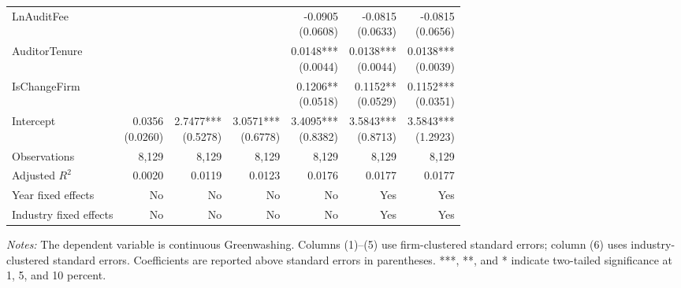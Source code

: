 \begin{table}[htbp]
{\begin{tabular}{lrrrrrr}
LnAuditFee &  &  &  & \shortstack{-0.0905 \\ (0.0608)} & \shortstack{-0.0815 \\ (0.0633)} & \shortstack{-0.0815 \\ (0.0656)}\\[8pt]
AuditorTenure &  &  &  & \shortstack{0.0148*** \\ (0.0044)} & \shortstack{0.0138*** \\ (0.0044)} & \shortstack{0.0138*** \\ (0.0039)}\\[8pt]
IsChangeFirm &  &  &  & \shortstack{0.1206** \\ (0.0518)} & \shortstack{0.1152** \\ (0.0529)} & \shortstack{0.1152*** \\ (0.0351)}\\[8pt]
Intercept & \shortstack{0.0356 \\ (0.0260)} & \shortstack{2.7477*** \\ (0.5278)} & \shortstack{3.0571*** \\ (0.6778)} & \shortstack{3.4095*** \\ (0.8382)} & \shortstack{3.5843*** \\ (0.8713)} & \shortstack{3.5843*** \\ (1.2923)}\\[8pt]
Observations & 8,129 & 8,129 & 8,129 & 8,129 & 8,129 & 8,129\\
Adjusted \(R^2\) & 0.0020 & 0.0119 & 0.0123 & 0.0176 & 0.0177 & 0.0177\\
Year fixed effects & No & No & No & No & Yes & Yes\\
Industry fixed effects & No & No & No & No & Yes & Yes\\
\hline\end{tabular}}
\begin{minipage}{0.98\textwidth}\footnotesize\textit{Notes:} The dependent variable is continuous Greenwashing. Columns (1)--(5) use firm-clustered standard errors; column (6) uses industry-clustered standard errors. Coefficients are reported above standard errors in parentheses. ***, **, and * indicate two-tailed significance at 1, 5, and 10 percent.\end{minipage}
\end{table}